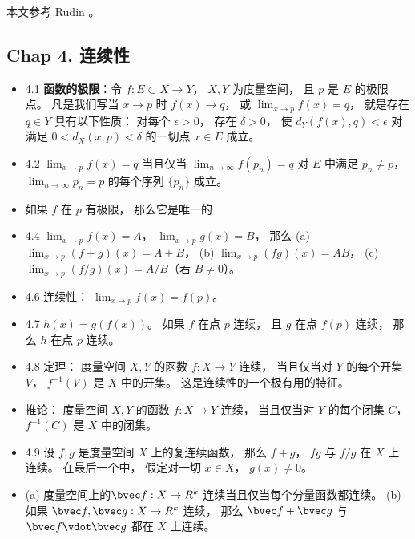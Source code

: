 
本文参考 Rudin \cite{Rudin}。

\subsection{Chap 4. 连续性}

\begin{itemize}
\item 4.1 \textbf{函数的极限}：令 $f:E\subset X\to Y$， $X,Y$ 为度量空间， 且 $p$ 是 $E$ 的极限点。 凡是我们写当 $x\to p$ 时 $f(x)\to q$， 或 $\lim_{x\to p}f(x)=q$， 就是存在 $q\in Y$ 具有以下性质： 对每个 $\epsilon>0$， 存在 $\delta>0$， 使 $d_{Y}(f(x),q)<\epsilon$ 对满足 $0<d_X(x,p)<\delta$ 的一切点 $x\in E$ 成立。

\item 4.2 $\lim_{x\to p}f(x)=q$ 当且仅当 $\lim_{n\to\infty} f(p_n)=q$ 对 $E$ 中满足 $p_n\ne p$， $\lim_{n\to\infty} p_n=p$ 的每个序列 $\{p_n\}$ 成立。

\item 如果 $f$ 在 $p$ 有极限， 那么它是唯一的

\item 4.4 $\lim_{x\to p}f(x)=A$， $\lim_{x\to p}g(x)=B$， 那么 (a) $\lim_{x\to p}(f+g)(x)=A+B$， (b) $\lim_{x\to p}(fg)(x)=AB$， (c) $\lim_{x\to p}(f/g)(x)=A/B$（若 $B\ne 0$）。

\item 4.6 连续性： $\lim_{x\to p}f(x)=f(p)$。

\item 4.7 $h(x) = g(f(x))$。 如果 $f$ 在点 $p$ 连续， 且 $g$ 在点 $f(p)$ 连续， 那么 $h$ 在点 $p$ 连续。

\item 4.8 定理： 度量空间 $X,Y$ 的函数 $f:X\to Y$ 连续， 当且仅当对 $Y$ 的每个开集 $V$， $f^{-1}(V)$ 是 $X$ 中的开集。 这是连续性的一个极有用的特征。

\item 推论： 度量空间 $X,Y$ 的函数 $f:X\to Y$ 连续， 当且仅当对 $Y$ 的每个闭集 $C$， $f^{-1}(C)$ 是 $X$ 中的闭集。

\item 4.9 设 $f,g$ 是度量空间 $X$ 上的复连续函数， 那么 $f+g$， $fg$ 与 $f/g$ 在 $X$ 上连续。 在最后一个中， 假定对一切 $x\in X$， $g(x)\ne 0$。

\item (a) 度量空间上的$\bvec f:X\to R^k$ 连续当且仅当每个分量函数都连续。 (b) 如果 $\bvec f, \bvec g:X\to R^k$ 连续， 那么 $\bvec f+\bvec g$ 与 $\bvec f\vdot \bvec g$ 都在 $X$ 上连续。


\end{itemize}
